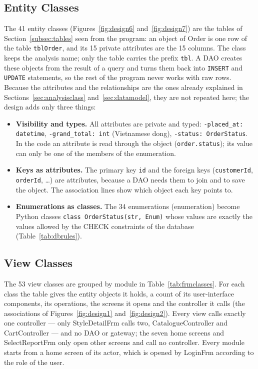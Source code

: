 \subsection{Entity Classes}
\label{subsec:entityclasses}
The 41 entity classes (Figures~\ref{fig:design6} and~\ref{fig:design7}) are the tables of Section~\ref{subsec:tables} seen from the program: an object of \textsf{Order} is one row of the table \texttt{tblOrder}, and its 15 private attributes are the 15 columns. The class keeps the analysis name; only the table carries the prefix \texttt{tbl}. A DAO creates these objects from the result of a query and turns them back into \texttt{INSERT} and \texttt{UPDATE} statements, so the rest of the program never works with raw rows. Because the attributes and the relationships are the ones already explained in Sections~\ref{sec:analysisclass} and~\ref{sec:datamodel}, they are not repeated here; the design adds only three things:
\begin{itemize}
  \item \textbf{Visibility and types.} All attributes are private and typed: \texttt{-placed\_at: datetime}, \texttt{-grand\_total: int} (Vietnamese dong), \texttt{-status: OrderStatus}. In the code an attribute is read through the object (\texttt{order.status}); its value can only be one of the members of the enumeration.
  \item \textbf{Keys as attributes.} The primary key \texttt{id} and the foreign keys (\texttt{customerId}, \texttt{orderId}, \ldots) are attributes, because a DAO needs them to join and to save the object. The association lines show which object each key points to.
  \item \textbf{Enumerations as classes.} The 34 enumerations (\guillemotleft enumeration\guillemotright) become Python classes \texttt{class OrderStatus(str, Enum)} whose values are exactly the values allowed by the CHECK constraints of the database (Table~\ref{tab:dbrules}).
\end{itemize}

\subsection{View Classes}
\label{subsec:viewclasses}
The 53 view classes are grouped by module in Table~\ref{tab:frmclasses}. For each class the table gives the entity objects it holds, a count of its user-interface components, its operations, the screens it opens and the controller it calls (the associations of Figures~\ref{fig:design1} and~\ref{fig:design2}). Every view calls exactly one controller --- only \textsf{StyleDetailFrm} calls two, \textsf{CatalogueController} and \textsf{CartController} --- and no DAO or gateway; the seven home screens and \textsf{SelectReportFrm} only open other screens and call no controller. Every module starts from a home screen of its actor, which is opened by \textsf{LoginFrm} according to the role of the user.

